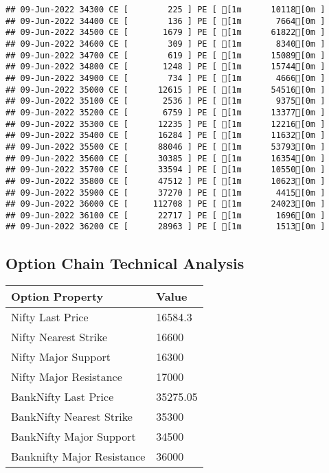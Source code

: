 \documentclass[
]{article}
\begin{document}
\begin{verbatim}
## 09-Jun-2022 34300 CE [        225 ] PE [ [1m      10118[0m ]
## 09-Jun-2022 34400 CE [        136 ] PE [ [1m       7664[0m ]
## 09-Jun-2022 34500 CE [       1679 ] PE [ [1m      61822[0m ]
## 09-Jun-2022 34600 CE [        309 ] PE [ [1m       8340[0m ]
## 09-Jun-2022 34700 CE [        619 ] PE [ [1m      15089[0m ]
## 09-Jun-2022 34800 CE [       1248 ] PE [ [1m      15744[0m ]
## 09-Jun-2022 34900 CE [        734 ] PE [ [1m       4666[0m ]
## 09-Jun-2022 35000 CE [      12615 ] PE [ [1m      54516[0m ]
## 09-Jun-2022 35100 CE [       2536 ] PE [ [1m       9375[0m ]
## 09-Jun-2022 35200 CE [       6759 ] PE [ [1m      13377[0m ]
## 09-Jun-2022 35300 CE [      12235 ] PE [ [1m      12216[0m ]
## 09-Jun-2022 35400 CE [      16284 ] PE [ [1m      11632[0m ]
## 09-Jun-2022 35500 CE [      88046 ] PE [ [1m      53793[0m ]
## 09-Jun-2022 35600 CE [      30385 ] PE [ [1m      16354[0m ]
## 09-Jun-2022 35700 CE [      33594 ] PE [ [1m      10550[0m ]
## 09-Jun-2022 35800 CE [      47512 ] PE [ [1m      10623[0m ]
## 09-Jun-2022 35900 CE [      37270 ] PE [ [1m       4415[0m ]
## 09-Jun-2022 36000 CE [     112708 ] PE [ [1m      24023[0m ]
## 09-Jun-2022 36100 CE [      22717 ] PE [ [1m       1696[0m ]
## 09-Jun-2022 36200 CE [      28963 ] PE [ [1m       1513[0m ]
\end{verbatim}

\hypertarget{option-technical-analysis}{%
\subsection{Option Chain Technical
Analysis}\label{option-technical-analysis}}

\begin{longtable}[]{@{}ll@{}}
\toprule
Option Property & Value \\
\midrule
\endhead
Nifty Last Price & 16584.3 \\
Nifty Nearest Strike & 16600 \\
Nifty Major Support & 16300 \\
Nifty Major Resistance & 17000 \\
BankNifty Last Price & 35275.05 \\
BankNifty Nearest Strike & 35300 \\
BankNifty Major Support & 34500 \\
Banknifty Major Resistance & 36000 \\
\bottomrule
\end{longtable}
\end{document}
